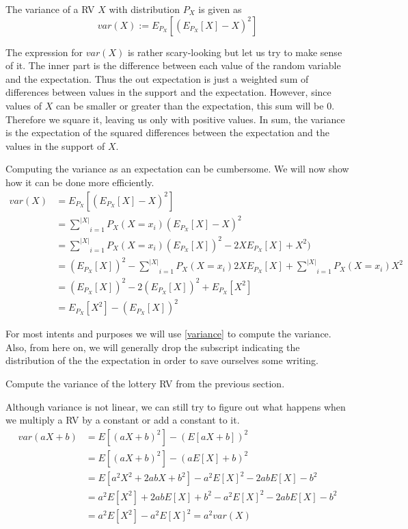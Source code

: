 \documentclass[a4paper,11pt,leqno]{report}
\begin{document}
\begin{Definition}
The variance of a RV $ X $ with distribution $ P_{X} $ is given as
$$ var(X) := E_{P_{X}}[(E_{P_{X}}[X] - X)^{2}] $$
\end{Definition}

The expression for $ var(X) $ is rather scary-looking but let us try to make sense of it. The inner part is the difference between
each value of the random variable and the expectation. Thus the out expectation is just a weighted sum of differences between 
values in the support and the expectation. However, since values of $ X $ can be smaller or greater than the expectation, this
sum will be 0. Therefore we square it, leaving us only with positive values. In sum, the variance is the expectation
of the squared differences between the expectation and the values in the support of $ X $.

Computing the variance as an expectation can be cumbersome. We will now show how it can be done more efficiently.
\begin{align}
var(X) &= E_{P_{X}}[(E_{P_{X}}[X] - X)^{2}] \\
&= \underset{i = 1}{\overset{|X|}{\sum}} P_{X}(X=x_{i}) (E_{P_{X}}[X] - X)^{2} \\
&= \underset{i = 1}{\overset{|X|}{\sum}} P_{X}(X=x_{i}) (E_{P_{X}}[X])^{2} - 2XE_{P_{X}}[X] + X^{2}) \\
&= (E_{P_{X}}[X])^{2} - \underset{i = 1}{\overset{|X|}{\sum}} P_{X}(X=x_{i}) 2XE_{P_{X}}[X]
+  \underset{i = 1}{\overset{|X|}{\sum}} P_{X}(X=x_{i})  X^{2} \\
&= (E_{P_{X}}[X])^{2} -  2(E_{P_{X}}[X])^{2} +  E_{P_{X}}[X^{2}] \\
&= E_{P_{X}}[X^{2}] - (E_{P_{X}}[X])^{2} \label{variance}
\end{align}

For most intents and purposes we will use \ref{variance} to compute the variance. Also, from here on, we will generally drop the 
subscript indicating the distribution of the the expectation in order to save ourselves some writing.

\begin{Exercise}
Compute the variance of the lottery RV from the previous section.
\end{Exercise}

Although variance is not linear, we can still try to figure out what happens when we multiply a RV by a constant or add a constant to it.
\begin{align}
var(aX+b) &= E[(aX+b)^{2}] - (E[aX+b])^{2} \\
&= E[(aX+b)^{2}] - (aE[X]+b)^{2} \\
&= E[a^{2}X^{2} + 2abX + b^{2}] - a^{2}E[X]^{2} - 2abE[X] - b^{2} \\
&= a^{2}E[X^{2}] + 2abE[X] + b^{2} - a^{2}E[X]^{2} - 2abE[X] - b^{2} \\
&= a^{2}E[X^{2}] - a^{2}E[X]^{2} = a^{2}var(X) \
\end{align}
\end{document}
